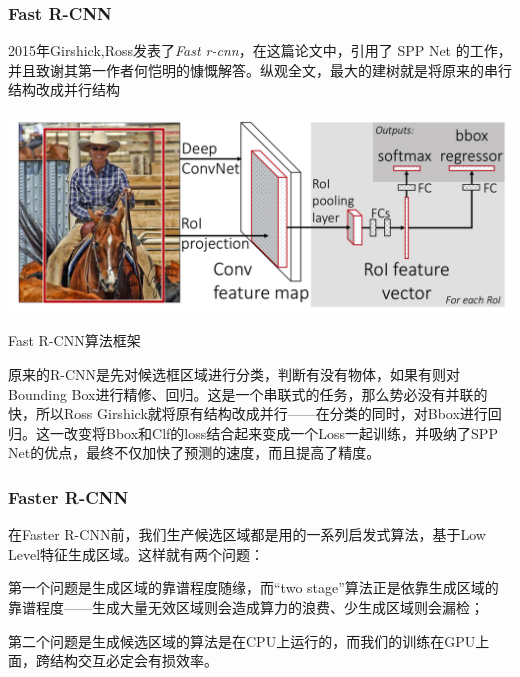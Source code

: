 \subsubsection{Fast R-CNN}
2015年Girshick,Ross发表了\textit{Fast r-cnn}\cite{fastrcnn}，在这篇论文中，引用了 SPP Net 的工作，并且致谢其第一作者何恺明的慷慨解答。纵观全文，最大的建树就是将原来的串行结构改成并行结构
\begin{uscfigure}
	\includegraphics[width=\textwidth]{./Pictures/fast_rcnn.png}	
	\caption{Fast R-CNN算法框架}	
\end{uscfigure}
原来的R-CNN是先对候选框区域进行分类，判断有没有物体，如果有则对Bounding Box进行精修、回归。这是一个串联式的任务，那么势必没有并联的快，所以Ross Girshick就将原有结构改成并行——在分类的同时，对Bbox进行回归。这一改变将Bbox和Clf的loss结合起来变成一个Loss一起训练，并吸纳了SPP Net的优点，最终不仅加快了预测的速度，而且提高了精度。
\subsubsection{Faster R-CNN}
在Faster R-CNN前，我们生产候选区域都是用的一系列启发式算法，基于Low Level特征生成区域。这样就有两个问题：

第一个问题是生成区域的靠谱程度随缘，而“two stage”算法正是依靠生成区域的靠谱程度——生成大量无效区域则会造成算力的浪费、少生成区域则会漏检；

第二个问题是生成候选区域的算法是在CPU上运行的，而我们的训练在GPU上面，跨结构交互必定会有损效率。

